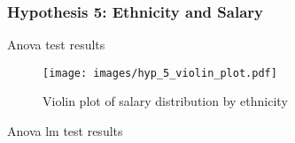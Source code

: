 \subsubsection{Hypothesis 5: Ethnicity and Salary}

\begin{table}[H]
    \centering
    \caption{Anova test results}
    \label{tab:anova results}
    \begin{minipage}{\columnwidth}
        
    \end{minipage}
\end{table}

\begin{figure}[H]
    \centering
    \texttt{[image: images/hyp\_5\_violin\_plot.pdf]} %
    \caption{Violin plot of salary distribution by ethnicity}
    \label{fig:violin plot of salary distribution by ethnicity}
\end{figure}

\begin{table}[H]
    \centering
    \caption{Anova lm test results}
    \label{tab:anova lm results}
    \begin{minipage}{\columnwidth}
        
    \end{minipage}
\end{table}
